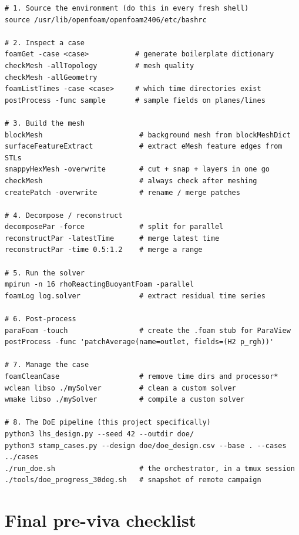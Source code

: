 \documentclass[11pt,a4paper]{article}
\begin{document}
\begin{lstlisting}[style=bashstyle,caption={The 25 commands that cover 95\% of OpenFOAM use}]
# 1. Source the environment (do this in every fresh shell)
source /usr/lib/openfoam/openfoam2406/etc/bashrc

# 2. Inspect a case
foamGet -case <case>           # generate boilerplate dictionary
checkMesh -allTopology         # mesh quality
checkMesh -allGeometry
foamListTimes -case <case>     # which time directories exist
postProcess -func sample       # sample fields on planes/lines

# 3. Build the mesh
blockMesh                       # background mesh from blockMeshDict
surfaceFeatureExtract           # extract eMesh feature edges from STLs
snappyHexMesh -overwrite        # cut + snap + layers in one go
checkMesh                       # always check after meshing
createPatch -overwrite          # rename / merge patches

# 4. Decompose / reconstruct
decomposePar -force             # split for parallel
reconstructPar -latestTime      # merge latest time
reconstructPar -time 0.5:1.2    # merge a range

# 5. Run the solver
mpirun -n 16 rhoReactingBuoyantFoam -parallel
foamLog log.solver              # extract residual time series

# 6. Post-process
paraFoam -touch                 # create the .foam stub for ParaView
postProcess -func 'patchAverage(name=outlet, fields=(H2 p_rgh))'

# 7. Manage the case
foamCleanCase                   # remove time dirs and processor*
wclean libso ./mySolver         # clean a custom solver
wmake libso ./mySolver          # compile a custom solver

# 8. The DoE pipeline (this project specifically)
python3 lhs_design.py --seed 42 --outdir doe/
python3 stamp_cases.py --design doe/doe_design.csv --base . --cases ../cases
./run_doe.sh                    # the orchestrator, in a tmux session
./tools/doe_progress_30deg.sh   # snapshot of remote campaign
\end{lstlisting}

\clearpage
\section{Final pre-viva checklist}
\end{document}
